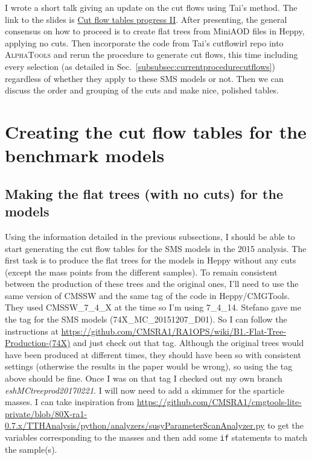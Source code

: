 I wrote a short talk giving an update on the cut flows using Tai's method. The link to the slides is \href{run:modules/Sec 18 - Cut flow tables for SUS-15-005/figures/Cut flow tables progress II.pdf}{Cut flow tables progress II}. After presenting, the general consensus on how to proceed is to create flat trees from MiniAOD files in Heppy, applying no cuts. Then incorporate the code from Tai's cutflowirl repo into \textsc{AlphaTools} and rerun the procedure to generate cut flows, this time including every selection (as detailed in Sec.~\ref{subsubsec:currentprocedurecutflows}) regardless of whether they apply to these SMS models or not. Then we can discuss the order and grouping of the cuts and make nice, polished tables.

\section{Creating the cut flow tables for the benchmark models}

\subsection{Making the flat trees (with no cuts) for the models}

Using the information detailed in the previous subsections, I should be able to start generating the cut flow tables for the SMS models in the 2015 analysis. The first task is to produce the flat trees for the models in Heppy without any cuts (except the mass points from the different samples). To remain consistent between the production of these trees and the original ones, I'll need to use the same version of CMSSW and the same tag of the code in Heppy/CMGTools. They used CMSSW\_7\_4\_X at the time so I'm using 7\_4\_14. Stefano gave me the tag for the SMS models (74X\_MC\_20151207\_D01). So I can follow the instructions at \url{https://github.com/CMSRA1/RA1OPS/wiki/B1.-Flat-Tree-Production-(74X)} and just check out that tag. Although the original trees would have been produced at different times, they should have been so with consistent settings (otherwise the results in the paper would be wrong), so using the tag above should be fine. Once I was on that tag I checked out my own branch \emph{eshMCtreeprod20170221}. I will now need to add a skimmer for the sparticle masses. I can take inspiration from \url{https://github.com/CMSRA1/cmgtools-lite-private/blob/80X-ra1-0.7.x/TTHAnalysis/python/analyzers/susyParameterScanAnalyzer.py} to get the variables corresponding to the masses and then add some \verb!if! statements to match the sample(s).

